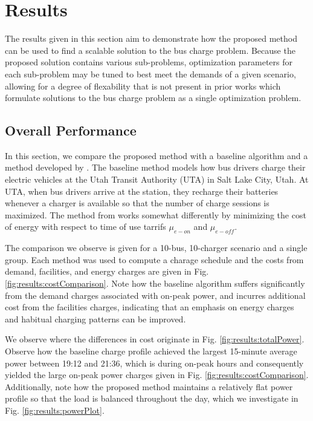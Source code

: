 \section{Results}

The results given in this section aim to demonstrate how the proposed method can be used to find a scalable solution to the bus charge problem. Because the proposed solution contains various sub-problems, optimization parameters for each sub-problem may be tuned to best meet the demands of a given scenario, allowing for a degree of flexability that is not present in prior works which formulate solutions to the bus charge problem as a single optimization problem.

\subsection{Overall Performance}

In this section, we compare the proposed method with a baseline algorithm and a method developed by \cite{he_battery_2022}. The baseline method models how bus drivers charge their electric vehicles at the Utah Transit Authority (UTA) in Salt Lake City, Utah. At UTA, when bus drivers arrive at the station, they recharge their batteries whenever a charger is available so that the number of charge sessions is maximized. The method from \cite{he_battery_2022} works somewhat differently by minimizing the cost of energy with respect to time of use tarrifs $\mu_{e-on}$ and $\mu_{e-off}$.

\par The comparison we observe is given for a 10-bus, 10-charger scenario and a single group. Each method was used to compute a charage schedule and the costs from demand, facilities, and energy charges are given in Fig. \ref{fig:results:costComparison}. Note how the baseline algorithm suffers significantly from the demand charges associated with on-peak power, and \cite{he_battery_2022} incurres additional cost from the facilities charges, indicating that an emphasis on energy charges and habitual charging patterns can be improved.

\par We observe where the differences in cost originate in Fig. \ref{fig:results:totalPower}. Observe how the baseline charge profile achieved the largest 15-minute average power between 19:12 and 21:36, which is during on-peak hours and consequently yielded the large on-peak power charges given in Fig. \ref{fig:results:costComparison}. Additionally, note how the proposed method maintains a relatively flat power profile so that the load is balanced throughout the day, which we investigate in Fig. \ref{fig:results:powerPlot}.

